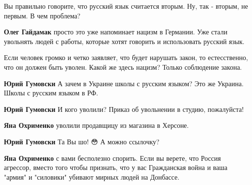 \begin{itemize}
Вы правильно говорите, что русский язык считается вторым. Ну, так - вторым, не
первым. В чем проблема?




\textbf{Олег Гайдамак} просто это уже напоминает нацизм в Германии. Уже стали
увольнять людей с работы, которые хотят говорить и использовать русский язык.


Если человек громко и четко заявляет, что будет нарушать закон, то естесственно, что он должен быть уволен. Какой же здесь нацизм? Только соблюдение закона.


\textbf{Юрий Гумовски} А зачем в Украине школы с русским языком? Это же Украина. Школы с русским языком в РФ.


\textbf{Юрий Гумовски} И кого уволили? Приказ об увольнении в студию, пожалуйста!


\textbf{Яна Охрименко} уволили продавщицу из магазина в Херсоне.


\textbf{Юрий Гумовски} Та Вы шо! 😳 А можно ссылочку?


\textbf{Яна Охрименко} с вами бесполезно спорить. Если вы верете, что Россия агрессор, вместо того чтобы признать, что у вас Гражданская война и ваша "армия" и "силовики" убивают мирных людей на Донбассе.



\end{itemize}
